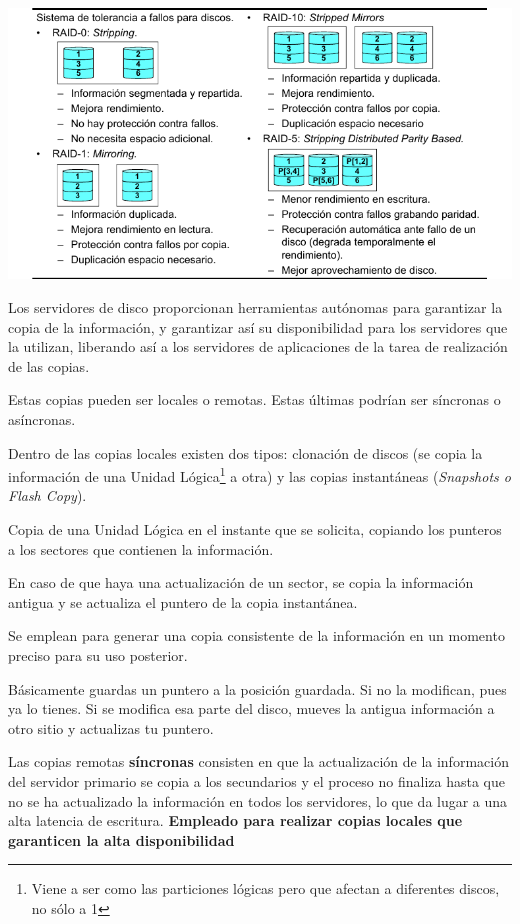 \begin{center}
\includegraphics[width=\linewidth]{img/raid.png}
\end{center}

Los servidores de disco proporcionan herramientas autónomas para garantizar la copia de la información, y garantizar así su disponibilidad para los servidores que la utilizan, liberando así a los servidores de aplicaciones de la tarea de realización de las copias.

Estas copias pueden ser locales o remotas. Estas últimas podrían ser síncronas o asíncronas.

Dentro de las copias locales existen dos tipos: clonación de discos (se copia la información de una Unidad Lógica\footnote{Viene a ser como las particiones lógicas pero que afectan a diferentes discos, no sólo a 1} a otra) y las copias instantáneas (\textit{Snapshots o Flash Copy}).

\begin{defn}
Copia de una Unidad Lógica en el instante que se solicita, copiando los punteros a los sectores que contienen la información.

En caso de que haya una actualización de un sector, se copia la información antigua y se actualiza el puntero de la copia instantánea.

Se emplean para generar una copia consistente de la información en un momento preciso para su uso posterior.

\obs Básicamente guardas un puntero a la posición guardada. Si no la modifican, pues ya lo tienes. Si se modifica esa parte del disco, mueves la antigua información a otro sitio y actualizas tu puntero.
\end{defn}

Las copias remotas \textbf{síncronas} consisten en que la actualización de la información del servidor primario se copia a los secundarios y el proceso no finaliza hasta que no se ha actualizado la información en todos los servidores, lo que da lugar a una alta latencia de escritura. \textbf{Empleado para realizar copias locales que garanticen la alta disponibilidad}

